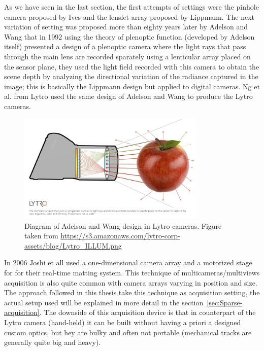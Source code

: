 \bigskip

As we have seen in the last section, the first attempts of settings were the pinhole camera proposed by Ives and the lenslet array proposed by Lippmann. The next variation of setting was proposed more than eighty years later by Adelson and Wang \cite{AdelsonWang} that in 1992 using the theory of plenoptic function (developed by Adelson itself) presented a design of a plenoptic camera where the light rays that pass through the main lens are recorded sparately using a lenticular array placed on the sensor plane, they used the light field recorded with this camera to obtain the scene depth by analyzing the directional variation of the radiance captured in the image; this is basically the Lippmann design but applied to digital cameras. Ng et al. \cite{Lytro} from Lytro used the same design of Adelson and Wang to produce the Lytro cameras.

\bigskip

\begin{figure}[h!]
\centering
\includegraphics[width= 0.80\textwidth]{./Diagrams/lytro_array.png}
\caption{Diagram of Adelson and Wang design in Lytro cameras. Figure taken from \url{https://s3.amazonaws.com/lytro-corp-assets/blog/Lytro_ILLUM.png}}
\end{figure}

\bigskip

In 2006 Joshi et all \cite{Joshi} used a one-dimensional camera array and a motorized stage for for their real-time matting system. This technique of multicameras/multiviews acquisition is also quite common with camera arrays varying in position and size. The approach followed in this thesis take this technique as acquisition setting, the actual setup used will be explained in more detail in the section~\ref{sec:Sparse-acquisition}. The downside of this acquisition device is that in counterpart of the Lytro camera (hand-held) it can be built without having a priori a designed custom optics, but hey are bulky and often not portable (mechanical tracks are generally quite big and heavy).

